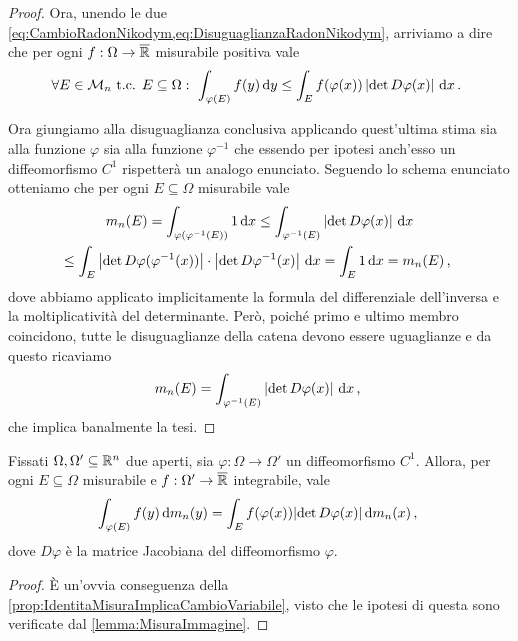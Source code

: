\begin{proof}
	Ora, unendo le due \cref{eq:CambioRadonNikodym,eq:DisuguaglianzaRadonNikodym}, arriviamo a dire che per ogni $f:\Omega\to\overline{\mathbb R}$ misurabile positiva vale
	\begin{equation*}
		\forall E\in \mathcal M_n\text{ t.c. } E\subseteq\Omega:\ \int_{\varphi(E)} f(y)\,\mathrm d y\le 
		\int_E f(\varphi(x))\left\lvert\det D\varphi(x)\right\rvert\,\mathrm d x \, \text{. }
	\end{equation*}
	
	Ora giungiamo alla disuguaglianza conclusiva applicando quest'ultima stima sia alla funzione $\varphi$ sia alla funzione $\varphi^{-1}$ che essendo per ipotesi anch'esso un diffeomorfismo $C^1$ rispetterà un analogo enunciato.
	Seguendo lo schema enunciato otteniamo che per ogni $E\subseteq\Omega$ misurabile vale
	\begin{multline*}
		m_n(E) =\int_{\varphi(\varphi^{-1}(E))}1\,\mathrm d x\le \int_{\varphi^{-1}(E)} \left\lvert\det D\varphi(x)\right\rvert\,\mathrm d x \\
 		\le \int_E \left\lvert\det D\varphi(\varphi^{-1}(x))\right\rvert \cdot \left\lvert\det D\varphi^{-1}(x)\right\rvert\,\mathrm d x =\int_E 1\,\mathrm d x=m_n(E) \, \text{, }
	\end{multline*}
	dove abbiamo applicato implicitamente la formula del differenziale dell'inversa e la moltiplicatività del determinante.
	Però, poiché primo e ultimo membro coincidono, tutte le disuguaglianze della catena devono essere uguaglianze e da questo ricaviamo
	\begin{equation*}
		m_n(E)=\int_{\varphi^{-1}(E)} \left\lvert\det D\varphi(x)\right\rvert\,\mathrm d x \, \text{, }
	\end{equation*}
	che implica banalmente la tesi.
\end{proof}

\begin{theorem}\label{thm:CambioVariabile}
	Fissati $\Omega,\Omega'\subseteq\mathbb R^n$ due aperti, sia $\varphi:\Omega\to\Omega'$ un diffeomorfismo $C^1$.
	Allora, per ogni $E\subseteq \Omega$ misurabile e $f:\Omega'\to\overline{\mathbb R}$ integrabile, vale
	\begin{equation*}
		\int_{\varphi(E)} f(y)\,\mathrm d m_n(y) = \int_{E} f(\varphi(x))\lvert \det D\varphi(x) \rvert \,\mathrm d m_n(x) \, \text{, }
	\end{equation*}
	dove $D\varphi$ è la matrice Jacobiana del diffeomorfismo $\varphi$.
\end{theorem}
\begin{proof}
	È un'ovvia conseguenza della \cref{prop:IdentitaMisuraImplicaCambioVariabile}, visto che le ipotesi di questa sono verificate dal \cref{lemma:MisuraImmagine}.
\end{proof}

